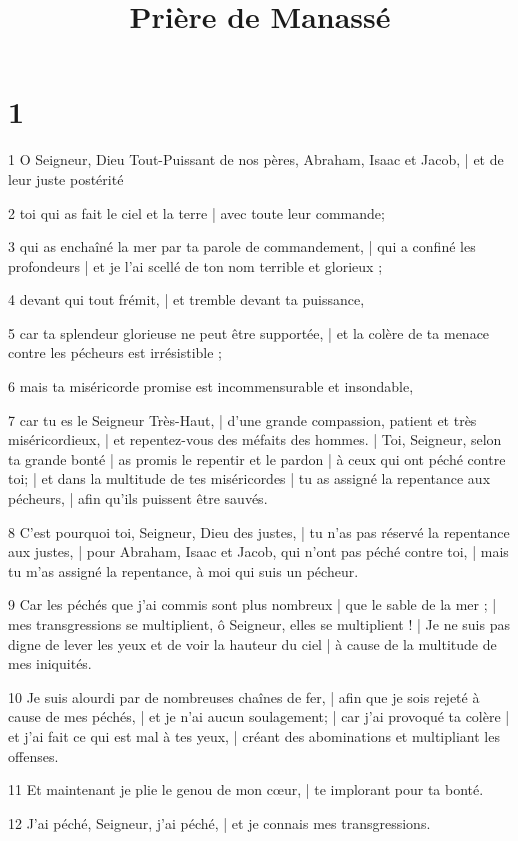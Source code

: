 

\title{Prière de Manassé}

\chapter{1}

\par 1 O Seigneur, Dieu Tout-Puissant de nos pères, Abraham, Isaac et Jacob, | et de leur juste postérité
\par 2 toi qui as fait le ciel et la terre | avec toute leur commande;
\par 3 qui as enchaîné la mer par ta parole de commandement, | qui a confiné les profondeurs | et je l'ai scellé de ton nom terrible et glorieux ;
\par 4 devant qui tout frémit, | et tremble devant ta puissance,
\par 5 car ta splendeur glorieuse ne peut être supportée, | et la colère de ta menace contre les pécheurs est irrésistible ;
\par 6 mais ta miséricorde promise est incommensurable et insondable,
\par 7 car tu es le Seigneur Très-Haut, | d'une grande compassion, patient et très miséricordieux, | et repentez-vous des méfaits des hommes. | Toi, Seigneur, selon ta grande bonté | as promis le repentir et le pardon | à ceux qui ont péché contre toi; | et dans la multitude de tes miséricordes | tu as assigné la repentance aux pécheurs, | afin qu'ils puissent être sauvés.
\par 8 C'est pourquoi toi, Seigneur, Dieu des justes, | tu n'as pas réservé la repentance aux justes, | pour Abraham, Isaac et Jacob, qui n'ont pas péché contre toi, | mais tu m'as assigné la repentance, à moi qui suis un pécheur.
\par 9 Car les péchés que j'ai commis sont plus nombreux | que le sable de la mer ; | mes transgressions se multiplient, ô Seigneur, elles se multiplient ! | Je ne suis pas digne de lever les yeux et de voir la hauteur du ciel | à cause de la multitude de mes iniquités.
\par 10 Je suis alourdi par de nombreuses chaînes de fer, | afin que je sois rejeté à cause de mes péchés, | et je n'ai aucun soulagement; | car j'ai provoqué ta colère | et j'ai fait ce qui est mal à tes yeux, | créant des abominations et multipliant les offenses.
\par 11 Et maintenant je plie le genou de mon cœur, | te implorant pour ta bonté.
\par 12 J'ai péché, Seigneur, j'ai péché, | et je connais mes transgressions.
